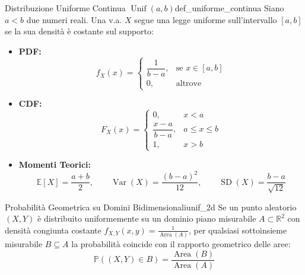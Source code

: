 \begin{definizione}{Distribuzione Uniforme Continua $\operatorname{Unif}(a, b)$}{def_uniforme_continua}
Siano $a < b$ due numeri reali. Una v.a. $X$ segue una legge uniforme sull'intervallo $[a, b]$ se la sua densità è costante sul supporto:
\begin{itemize}
    \item \textbf{PDF:}
    \begin{equation}
        f_X(x) = \begin{cases}
            \dfrac{1}{b - a}, & \text{se } x \in [a, b] \\
            0, & \text{altrove}
        \end{cases}
    \end{equation}
    \item \textbf{CDF:}
    \begin{equation}
        F_X(x) = \begin{cases}
            0, & x < a \\
            \dfrac{x - a}{b - a}, & a \le x \le b \\
            1, & x > b
        \end{cases}
    \end{equation}
    \item \textbf{Momenti Teorici:}
    \begin{equation}
        \mathbb{E}[X] = \frac{a + b}{2}, \qquad \operatorname{Var}(X) = \frac{(b - a)^2}{12}, \qquad \operatorname{SD}(X) = \frac{b - a}{\sqrt{12}}
    \end{equation}
\end{itemize}
\end{definizione}

\begin{proposizione}{Probabilità Geometrica su Domini Bidimensionali}{unif_2d}
Se un punto aleatorio $(X, Y)$ è distribuito uniformemente su un dominio piano misurabile $A \subset \mathbb{R}^2$ con densità congiunta costante $f_{X,Y}(x,y) = \frac{1}{\operatorname{Area}(A)}$, per qualsiasi sottoinsieme misurabile $B \subseteq A$ la probabilità coincide con il rapporto geometrico delle aree:
\begin{equation}
    \mathbb{P}((X, Y) \in B) = \frac{\operatorname{Area}(B)}{\operatorname{Area}(A)}
\end{equation}
\end{proposizione}


